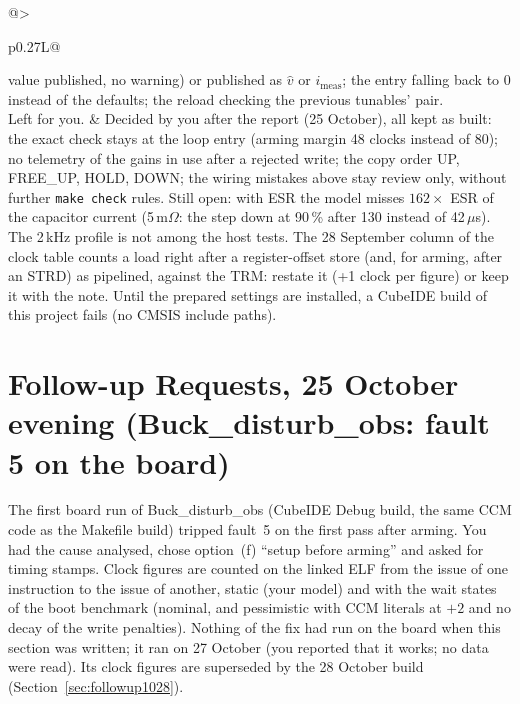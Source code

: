 \documentclass[11pt]{article}
\newcommand{\code}[1]{\texttt{\detokenize{#1}}}
\begin{document}
{\begin{xltabular}{\linewidth}{@{}>{\raggedright\arraybackslash}p{0.27\linewidth}L@{}}
    value published, no warning) or published as $\hat v$ or
    $i_\mathrm{meas}$; the entry falling back to 0 instead of the defaults;
    the reload checking the previous tunables' pair. \\
Left for you.
  & Decided by you after the report (25 October), all kept as built: the
    exact check stays at the loop entry (arming margin 48 clocks instead of
    80); no telemetry of the gains in use after a rejected write; the copy
    order UP, FREE\_UP, HOLD, DOWN; the wiring mistakes above stay review
    only, without further \texttt{make check} rules. Still open: with ESR the model misses $162 \times$ ESR of the
    capacitor current (5\,m$\Omega$: the step down at 90\,\% after 130
    instead of 42\,$\mu$s). The 2\,kHz profile is not among the host
    tests. The 28 September column of the clock table counts a
    load right after a register-offset store (and, for arming, after an
    STRD) as pipelined, against the TRM: restate it (+1 clock per figure)
    or keep it with the note. Until the prepared settings are installed, a
    CubeIDE build of this project fails (no CMSIS include paths). \\
\bottomrule
\end{xltabular}}

\section{Follow-up Requests, 25 October evening (Buck\_disturb\_obs: fault 5 on the board)}
\label{sec:followup1025f}

The first board run of Buck\_disturb\_obs (CubeIDE Debug build, the same
CCM code as the Makefile build) tripped fault~5 on the first pass after
arming. You had the cause analysed, chose option~(f) ``setup before
arming'' and asked for timing stamps. Clock figures are counted on the
linked ELF from the issue of one instruction to the issue of another,
static (your model) and with the wait states of the boot benchmark
\code{g_buck.bench} (nominal, and pessimistic with CCM literals at
$+2$ and no decay of the write penalties). Nothing of the fix had run on
the board when this section was written; it ran on 27 October (you
reported that it works; no data were read). Its clock figures are
superseded by the 28 October build (Section~\ref{sec:followup1028}).
\end{document}
